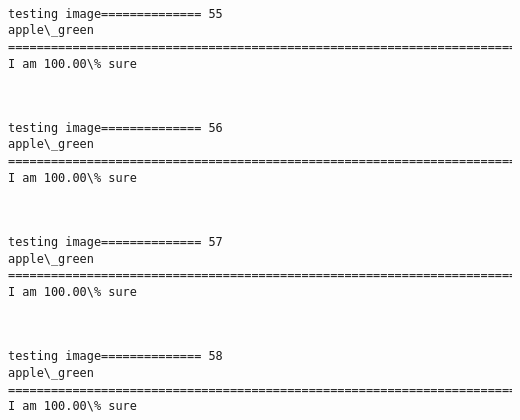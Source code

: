 \documentclass[11pt]{article}
\begin{document}
    \begin{center}
    \end{center}
    { \hspace*{\fill} \\}
    
    \begin{Verbatim}[commandchars=\\\{\}]
testing image============== 55
apple\_green
============================================================================
I am 100.00\% sure

    \end{Verbatim}

    \begin{center}
    \end{center}
    { \hspace*{\fill} \\}
    
    \begin{Verbatim}[commandchars=\\\{\}]
testing image============== 56
apple\_green
============================================================================
I am 100.00\% sure

    \end{Verbatim}

    \begin{center}
    \end{center}
    { \hspace*{\fill} \\}
    
    \begin{Verbatim}[commandchars=\\\{\}]
testing image============== 57
apple\_green
============================================================================
I am 100.00\% sure

    \end{Verbatim}

    \begin{center}
    \end{center}
    { \hspace*{\fill} \\}
    
    \begin{Verbatim}[commandchars=\\\{\}]
testing image============== 58
apple\_green
============================================================================
I am 100.00\% sure

    \end{Verbatim}
\end{document}
